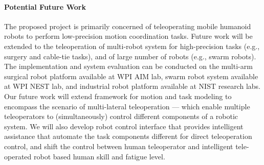 \paragraph{Potential Future Work} The proposed project is primarily concerned of teleoperating mobile humanoid robots to perform low-precision motion coordination tasks. Future work will be extended to the teleoperation of multi-robot system for high-precision tasks (e.g., surgery and cable-tie tasks), and of large number of robots (e.g., swarm robots). The implementation and system evaluation can be conducted on the multi-arm surgical robot platform available at WPI AIM lab, swarm robot system available at WPI NEST lab, and industrial robot platform available at NIST research labs. Our future work will extend framework for motion and task modeling to encompass the scenario of multi-lateral teleoperation --- which enable multiple teleoperators to (simultaneously) control different components of a robotic system.  We will also develop robot control interface that provides intelligent assistance that automate the task components different for direct teleoperation control, and shift the control between human teleoperator and intelligent tele-operated robot based human skill and fatigue level. 
